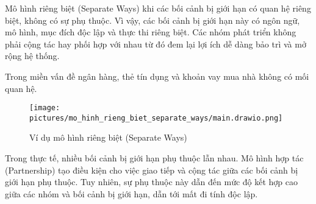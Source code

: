 








Mô hình riêng biệt (Separate Ways) khi các bối cảnh bị giới hạn có quan hệ riêng biệt, không có sự phụ thuộc. Vì vậy, các bối cảnh bị giới hạn này có ngôn ngữ, mô hình, mục đích độc lập và thực thi riêng biệt. Các nhóm phát triển không phải cộng tác hay phối hợp với nhau từ đó đem lại lợi ích dễ dàng bảo trì và mở rộng hệ thống.

\begin{example} Trong miền vấn đề ngân hàng, thẻ tín dụng và khoản vay mua nhà không có mối quan hệ.

    \begin{figure}[H]

        \centering

        \texttt{[image: pictures/mo\_hinh\_rieng\_biet\_separate\_ways/main.drawio.png]}

        \caption{Ví dụ mô hình riêng biệt (Separate Ways)}

    \end{figure}

\end{example}


Trong thực tế, nhiều bối cảnh bị giới hạn phụ thuộc lẫn nhau. Mô hình hợp tác (Partnership) tạo điều kiện cho việc giao tiếp và cộng tác giữa các bối cảnh bị giới hạn phụ thuộc. Tuy nhiên, sự phụ thuộc này dẫn đến mức độ kết hợp cao giữa các nhóm và bối cảnh bị giới hạn, dẫn tới mất đi tính độc lập.

